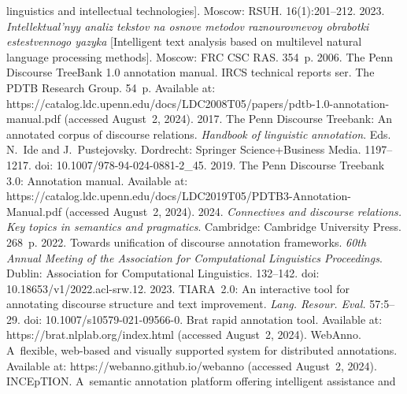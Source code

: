 \begin{multicols}{2}
{{\begin{thebibliography}{99}
linguistics and intellectual technologies].  Moscow: RSUH. 16(1):201--212.
 2023. \textit{Intellektual'nyy analiz tekstov na osno\-ve metodov raznourovnevoy 
obrabotki estestvennogo yazyka} [Intelligent text analysis based on multilevel natural language 
processing methods]. Moscow: FRC CSC RAS. 354~p.
 2006. The Penn 
Discourse TreeBank 1.0 annotation manual. IRCS technical reports ser. The PDTB Research Group. 54~p. Available at: 
{\sf https://catalog.\linebreak  ldc.upenn.edu/docs/LDC2008T05/papers/pdtb-1.0-annotation-manual.pdf} (accessed 
August~2, 2024).
 2017. The Penn Discourse Treebank: An annotated 
corpus of discourse relations. \textit{Handbook of linguistic annotation}. Eds. N.~Ide and J.~Pustejovsky. 
Dordrecht: Springer Science\;+\;Business Media. 1197--1217. doi: 10.1007/978-94-024-0881-2\_45.
 2019. The Penn Discourse Treebank 3.0: 
Annotation manual. Available at: {\sf https://catalog.ldc.upenn.edu/docs/\linebreak LDC2019T05/PDTB3-Annotation-Manual.pdf} (accessed August~2, 2024).
 2024. \textit{Connectives and discourse relations. Key topics in 
semantics and pragmatics}. Cambridge: Cambridge University Press. 268~p.
 2022. Towards unification of discourse annotation frameworks. \textit{60th 
Annual Meeting of the Association for Computational Linguistics Proceedings}. Dublin: Association for 
Computational Linguistics. 132--142. doi: 10.18653/v1/2022.acl-srw.12.
 2023. TIARA~2.0: An 
interactive tool for annotating discourse structure and text improvement. \textit{Lang. Resour. Eval.} 
57:5--29. doi: 10.1007/s10579-021-09566-0.
Brat rapid annotation tool. Available at: {\sf https://brat.\linebreak nlplab.org/index.html} (accessed August~2, 2024).
WebAnno. A~flexible, web-based and visually supported system for distributed 
annotations. Available at: {\sf https://\linebreak webanno.github.io/webanno} (accessed August~2, 2024).
INCEpTION. A~semantic annotation platform offering intelligent assistance and 

\end{thebibliography}}}
\end{multicols}
